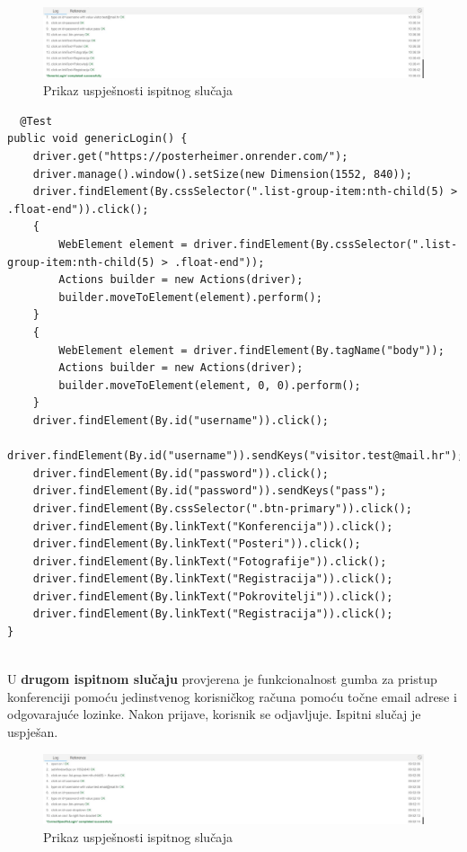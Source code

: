 			\begin{figure} [hbt!]
				\includegraphics[width=\linewidth]{Slike/genericLogin}
				\caption{Prikaz uspješnosti ispitnog slučaja}
			\end{figure}
			
			
			\begin{lstlisting}
  @Test
public void genericLogin() {
	driver.get("https://posterheimer.onrender.com/");
	driver.manage().window().setSize(new Dimension(1552, 840));
	driver.findElement(By.cssSelector(".list-group-item:nth-child(5) > .float-end")).click();
	{
		WebElement element = driver.findElement(By.cssSelector(".list-group-item:nth-child(5) > .float-end"));
		Actions builder = new Actions(driver);
		builder.moveToElement(element).perform();
	}
	{
		WebElement element = driver.findElement(By.tagName("body"));
		Actions builder = new Actions(driver);
		builder.moveToElement(element, 0, 0).perform();
	}
	driver.findElement(By.id("username")).click();
	driver.findElement(By.id("username")).sendKeys("visitor.test@mail.hr");
	driver.findElement(By.id("password")).click();
	driver.findElement(By.id("password")).sendKeys("pass");
	driver.findElement(By.cssSelector(".btn-primary")).click();
	driver.findElement(By.linkText("Konferencija")).click();
	driver.findElement(By.linkText("Posteri")).click();
	driver.findElement(By.linkText("Fotografije")).click();
	driver.findElement(By.linkText("Registracija")).click();
	driver.findElement(By.linkText("Pokrovitelji")).click();
	driver.findElement(By.linkText("Registracija")).click();
}


			\end{lstlisting}
			
			U \textbf{drugom ispitnom slučaju} provjerena je funkcionalnost gumba za pristup konferenciji pomoću jedinstvenog korisničkog računa pomoću točne email adrese i odgovarajuće lozinke. Nakon prijave, korisnik se odjavljuje. Ispitni slučaj je uspješan. 
			\begin{figure} [hbt!]
				\includegraphics[width=\linewidth]{Slike/CorrectSpecificLogin}
				\caption{Prikaz uspješnosti ispitnog slučaja}
			\end{figure}
			
